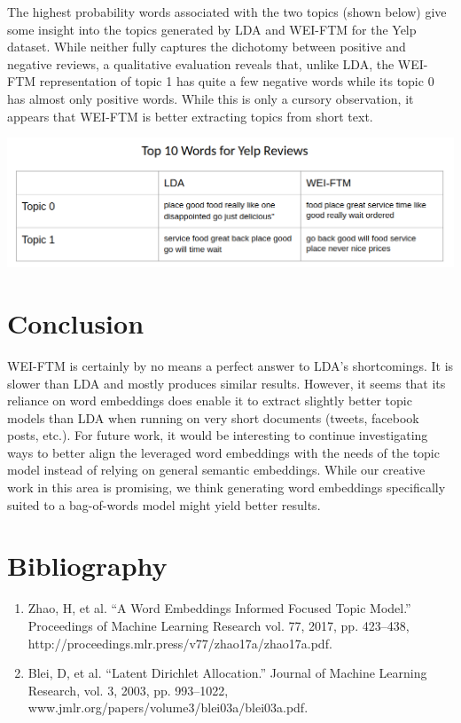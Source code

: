 \documentclass[letterpaper, 11pt]{article}
\begin{document}
\begin{multicols}{2}
The highest probability words associated with the two topics (shown below) give some insight into
the topics generated by LDA and WEI-FTM for the Yelp dataset.
While neither fully captures the dichotomy between positive and negative reviews, a qualitative
evaluation reveals that, unlike LDA, the WEI-FTM representation of topic 1 has quite a few
negative words while its topic 0 has almost only positive words.
While this is only a cursory observation, it appears that WEI-FTM is better extracting topics from
short text.

\begin{center}
\includegraphics[scale=.23]{yelp_table}
\end{center}

\section{Conclusion}
WEI-FTM is certainly by no means a perfect answer to LDA’s shortcomings. It is slower than LDA and mostly produces similar results. However, it seems that its reliance on word embeddings does enable it to extract slightly better topic models than LDA when running on very short documents (tweets, facebook posts, etc.). For future work, it would be interesting to continue investigating ways to better align the leveraged word embeddings with the needs of the topic model instead of relying on general semantic embeddings. While our creative work in this area is promising, we think generating word embeddings specifically suited to a bag-of-words model might yield better results.

\section{Bibliography}
\begin{enumerate}
\item Zhao, H, et al. “A Word Embeddings Informed Focused Topic Model.” Proceedings of Machine Learning Research vol. 77, 2017, pp. 423–438, http://proceedings.mlr.press/v77/zhao17a/zhao17a.pdf.

\item Blei, D, et al. “Latent Dirichlet Allocation.” Journal of Machine Learning Research, vol. 3, 2003, pp. 993–1022, www.jmlr.org/papers/volume3/blei03a/blei03a.pdf.


\end{enumerate}
\end{multicols}
\end{document}
